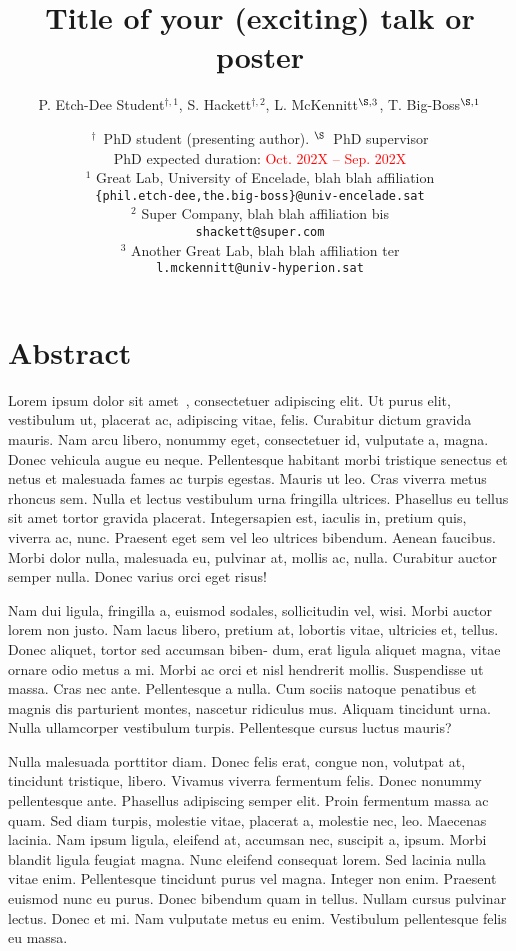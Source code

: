 \documentclass[a4paper,10pt,oneside]{article}
\title{%
  Title of your (exciting) talk or poster}
\author{%
  P. Etch-Dee Student${}^{\dagger,1}$, %
  S. Hackett${}^{\dagger,2}$, %
  L. McKennitt${}^{\S,3}$, %
  T. Big-Boss${}^{\S,1}$}
\date{\medskip%
  \small %
  ${}^\dagger$\ PhD student (presenting author). \quad ${}^{\S}$\ PhD supervisor\\[5pt]
  PhD expected duration: \textcolor{red}{Oct. 202X -- Sep. 202X}\\[15pt]
  ${}^1$  Great Lab, University of Encelade, blah blah affiliation\\
  \texttt{\{phil.etch-dee,the.big-boss\}@univ-encelade.sat}\\[4pt]
  ${}^2$  Super Company, blah blah affiliation bis\\
  \texttt{shackett@super.com}\\[4pt]
  ${}^3$  Another Great Lab, blah blah affiliation ter\\
  \texttt{l.mckennitt@univ-hyperion.sat}}
\begin{document}
\maketitle
\thispagestyle{fancy}

\section*{Abstract}

Lorem ipsum dolor sit amet~\cite{greenwade93}, consectetuer adipiscing elit. Ut purus
elit, vestibulum ut, placerat ac, adipiscing vitae, felis. Curabitur
dictum gravida mauris. Nam arcu libero, nonummy eget, consectetuer id,
vulputate a, magna. Donec vehicula augue eu neque. Pellentesque
habitant morbi tristique senectus et netus et malesuada fames ac
turpis egestas. Mauris ut leo. Cras viverra metus rhoncus sem. Nulla
et lectus vestibulum urna fringilla ultrices.  Phasellus eu tellus sit
amet tortor gravida placerat. Integersapien est, iaculis in, pretium
quis, viverra ac, nunc. Praesent eget sem vel leo ultrices bibendum.
Aenean faucibus. Morbi dolor nulla, malesuada eu, pulvinar at, mollis
ac, nulla.  Curabitur auctor semper nulla. Donec varius orci eget
risus!

Nam dui ligula, fringilla a, euismod sodales, sollicitudin vel, wisi.
Morbi auctor lorem non justo. Nam lacus libero, pretium at, lobortis
vitae, ultricies et, tellus. Donec aliquet, tortor sed accumsan biben-
dum, erat ligula aliquet magna, vitae ornare odio metus a mi. Morbi ac
orci et nisl hendrerit mollis. Suspendisse ut massa. Cras nec ante.
Pellentesque a nulla. Cum sociis natoque penatibus et magnis dis
parturient montes, nascetur ridiculus mus. Aliquam tincidunt urna.
Nulla ullamcorper vestibulum turpis. Pellentesque cursus luctus
mauris?

Nulla malesuada porttitor diam. Donec felis erat, congue non, volutpat
at, tincidunt tristique, libero. Vivamus viverra fermentum felis.
Donec nonummy pellentesque ante. Phasellus adipiscing semper elit.
Proin fermentum massa ac quam. Sed diam turpis, molestie vitae,
placerat a, molestie nec, leo. Maecenas lacinia. Nam ipsum ligula,
eleifend at, accumsan nec, suscipit a, ipsum. Morbi blandit ligula
feugiat magna. Nunc eleifend consequat lorem. Sed lacinia nulla vitae
enim. Pellentesque tincidunt purus vel magna.  Integer non enim.
Praesent euismod nunc eu purus. Donec bibendum quam in tellus.  Nullam
cursus pulvinar lectus. Donec et mi. Nam vulputate metus eu enim.
Vestibulum pellentesque felis eu massa.
\end{document}
